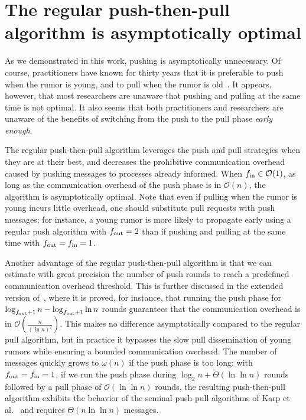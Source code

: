 \section{The regular push-then-pull algorithm is asymptotically optimal}
\label{sec:pushthenpull}

As we demonstrated in this work, pushing is asymptotically unnecessary. Of course, practitioners have known for thirty years that it is preferable to push when the rumor is young, and to pull when the rumor is old~\cite{Demers:1987:EAR:41840.41841}.  It appears, however, that most researchers are unaware that pushing and pulling at the same time is not optimal. It also seems that both practitioners and researchers are unaware of the benefits of switching from the push to the pull phase \emph{early enough}.

The regular push-then-pull algorithm leverages the push and pull strategies when they are at their best, and decreases the prohibitive communication overhead caused by pushing messages to processes already informed. When $f_\text{in}\in\mathcal{O}(1)$, as long as the communication overhead of the push phase is in $\mathcal{O}(n)$, the algorithm is asymptotically optimal. Note that even if pulling when the rumor is young incurs little overhead, one should substitute pull requests with push messages; for instance, a young rumor is more likely to propagate early using a regular push algorithm with $f_\text{out}=2$ than if pushing and pulling at the same time with ${f_\text{out}}=f_\text{in}=1$.

Another advantage of the regular push-then-pull algorithm is that we can estimate with great precision the number of push rounds to reach a predefined communication overhead threshold. This is further discussed in the extended version of~\cite{DBLP:conf/podc/MercierHM17}, where it is proved, for instance, that running the push phase for $\log_{f_\text{out}+1} n - \log_{f_\text{out}+1} \ln n$ rounds guarantees that the communication overhead is in  $\mathcal{O}\left(\frac{n}{(\ln n)^2}\right)$. This makes no difference asymptotically compared to the regular pull algorithm, but in practice it bypasses the slow pull dissemination of young rumors while ensuring a bounded communication overhead. The number of messages quickly grows to $\omega(n)$ if the push phase is too long: with $f_\text{out}=f_\text{in}=1$, if we run the push phase during $\log_2 n +\Theta(\ln \ln n)$ rounds followed by a pull phase of $\mathcal{O}(\ln \ln n)$ rounds, the resulting push-then-pull algorithm exhibits the behavior of the seminal push-pull algorithms of Karp et al.~\cite{DBLP:conf/focs/KarpSSV00} and requires $\Theta(n \ln \ln n)$ messages. 

